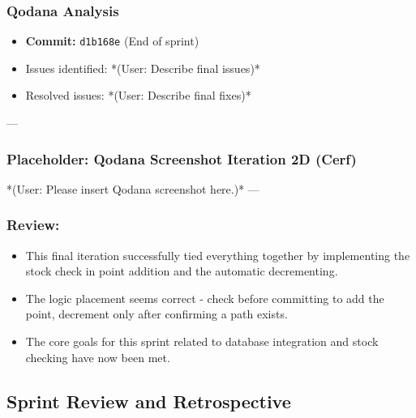 \subsubsection{Qodana Analysis}
\begin{itemize}
	\item \textbf{Commit:} \verb|d1b168e| (End of sprint)
	\item Issues identified: *(User: Describe final issues)*
	\item Resolved issues: *(User: Describe final fixes)*
\end{itemize}

--- %
\subsubsection*{Placeholder: Qodana Screenshot Iteration 2D (Cerf)}
*(User: Please insert Qodana screenshot here.)*
---

\subsubsection{Review:}
\begin{itemize}
	\item This final iteration successfully tied everything together by implementing the stock check in point addition and the automatic decrementing.
	\item The logic placement seems correct - check before committing to add the point, decrement only after confirming a path exists.
	\item The core goals for this sprint related to database integration and stock checking have now been met.
\end{itemize}

\clearpage
\subsection{Sprint Review and Retrospective}

